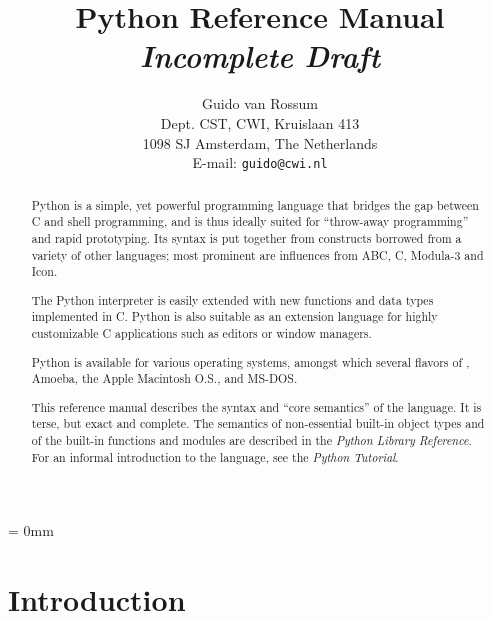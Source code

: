 

\title{\bf
	Python Reference Manual \\
	{\em Incomplete Draft}
}
	
\author{
	Guido van Rossum \\
	Dept. CST, CWI, Kruislaan 413 \\
	1098 SJ Amsterdam, The Netherlands \\
	E-mail: {\tt guido@cwi.nl}
}




\maketitle

\begin{abstract}

\noindent
Python is a simple, yet powerful programming language that bridges the
gap between C and shell programming, and is thus ideally suited for
``throw-away programming''
and rapid prototyping.  Its syntax is put
together from constructs borrowed from a variety of other languages;
most prominent are influences from ABC, C, Modula-3 and Icon.

The Python interpreter is easily extended with new functions and data
types implemented in C.  Python is also suitable as an extension
language for highly customizable C applications such as editors or
window managers.

Python is available for various operating systems, amongst which
several flavors of {\UNIX}, Amoeba, the Apple Macintosh O.S.,
and MS-DOS.

This reference manual describes the syntax and ``core semantics'' of
the language.  It is terse, but exact and complete.  The semantics of
non-essential built-in object types and of the built-in functions and
modules are described in the {\em Python Library Reference}.  For an
informal introduction to the language, see the {\em Python Tutorial}.

\end{abstract}

\pagebreak

{
\parskip = 0mm
\tableofcontents
}

\pagebreak


\chapter{Introduction}

